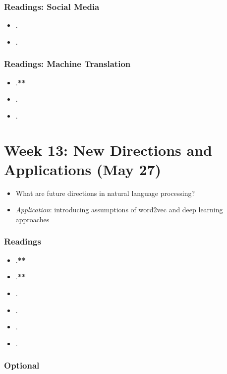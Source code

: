 \documentclass[abstract=on,parskip=full,headings=standardclasses,fontsize=11pt,paper=a4]{scrartcl}
\begin{document}
\subsubsection*{Readings: Social Media}
\begin{itemize}
\item {}.
\item {}.
\end{itemize}

\subsubsection*{Readings: Machine Translation}
\begin{itemize}
\item {}.\textbf{**}
\item {}.
\item {}.
\end{itemize}


\section{Week 13: New Directions and Applications (May 27)}


\begin{itemize}
\renewcommand\labelitemi{--}
\item What are future directions in natural language processing?
\item \textit{Application}: introducing assumptions of word2vec and deep learning approaches
\end{itemize}

\subsubsection*{Readings}
\begin{itemize}
\item {}.\textbf{**}
\item {}.\textbf{**}
\item {}.
\item {}.
\item {}.
\item {}.
\end{itemize}

\subsubsection*{Optional}
\end{document}
